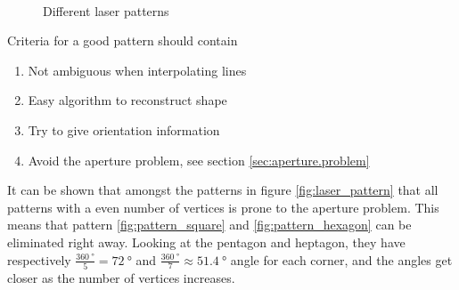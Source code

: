 \begin{figure}[htbp]
	\hfill
	\hfill
	\\
	\hfill
	\hfill
	\caption{Different laser patterns}
	\label{fig:laser_pattern}
\end{figure}

Criteria for a good pattern should contain
\begin{enumerate}
	\item Not ambiguous when interpolating lines
	\item Easy algorithm to reconstruct shape
	\item Try to give orientation information
	\item Avoid the aperture problem, see section \vref{sec:aperture.problem}
\end{enumerate}

It can be shown that amongst the patterns in figure \vref{fig:laser_pattern} that all patterns with a even number 
of vertices is prone to the aperture problem. This means that pattern \ref{fig:pattern_square} 
and \ref{fig:pattern_hexagon} can be eliminated right away. Looking at the pentagon and heptagon, they 
have respectively $\frac{\SI{360}{\degree}}{5} = \SI{72}{\degree}$ and $\frac{\SI{360}{\degree}}{7} \approx \SI{51.4}{\degree}$ angle 
for each corner, and the angles get closer as the number of vertices increases.

